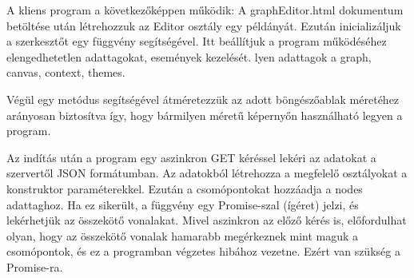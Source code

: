 

A kliens program a következőképpen működik: A graphEditor.html dokumentum betöltése után létrehozzuk az Editor osztály egy példányát. Ezután inicializáljuk a szerkesztőt egy függvény segítségével. Itt beállítjuk a program működéséhez elengedhetetlen adattagokat, események kezelését. lyen adattagok a graph, canvas, context, themes.

Végül egy metódus segítségével átméretezzük az adott böngészőablak méretéhez arányosan biztosítva így, hogy bármilyen méretű képernyőn használható legyen a program.


Az indítás után a program egy aszinkron GET kéréssel lekéri az adatokat a szervertől JSON formátumban. Az adatokból létrehozza a megfelelő osztályokat a konstruktor paraméterekkel. Ezután a csomópontokat hozzáadja a nodes adattaghoz. Ha ez sikerült, a függvény egy Promise-szal (ígéret) jelzi, és lekérhetjük az összekötő vonalakat. Mivel aszinkron az előző kérés is, előfordulhat olyan, hogy az összekötő vonalak hamarabb megérkeznek mint maguk a csomópontok, és ez a programban végzetes hibához vezetne. Ezért van szükség a Promise-ra. 

